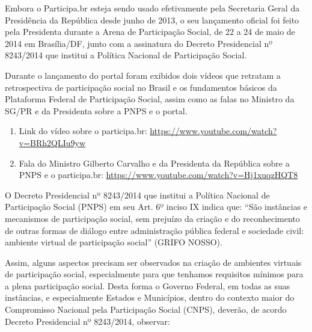 \documentclass{article}
\begin{document}
Embora o Participa.br esteja sendo usado efetivamente pela Secretaria Geral
da Presidência da República desde junho de 2013, o seu lançamento oficial foi
feito pela Presidenta durante a Arena de Participação Social, de 22 a 24 de
maio de 2014 em Brasília/DF, junto com a assinatura do Decreto Presidencial nº
8243/2014 que institui a Política Nacional de Participação Social.

Durante o lançamento do portal foram exibidos dois vídeos que retratam a
retrospectiva de participação social no Brasil e os fundamentos básicos da
Plataforma Federal de Participação Social, assim como as falas no Ministro da
SG/PR e da Presidenta sobre a PNPS e o portal.

\begin{enumerate}
  \item Link do vídeo sobre o participa.br: \url{https://www.youtube.com/watch?v=BRh2QLIu9yw}
  \item Fala do Ministro Gilberto Carvalho e da Presidenta da República sobre a PNPS e o participa.br: \url{https://www.youtube.com/watch?v=Hj1xuqzHQT8}
\end{enumerate}

O Decreto Presidencial nº 8243/2014 que institui a Política Nacional de
Participação Social (PNPS) em seu Art. 6º inciso IX indica que: ``São instâncias
e mecanismos de participação social, sem prejuízo da criação e do
reconhecimento de outras formas de diálogo entre administração pública federal
e sociedade civil: ambiente virtual de participação social'' (GRIFO NOSSO).

Assim, alguns aspectos precisam ser observados na criação de ambientes virtuais
de participação social, especialmente para que tenhamos requisitos mínimos para
a plena participação social. Desta forma o Governo Federal, em todas as suas
instâncias, e especialmente Estados e Municípios, dentro do contexto maior do
Compromisso Nacional pela Participação Social (CNPS), deverão, de acordo
Decreto Presidencial nº 8243/2014, observar:
\end{document}
